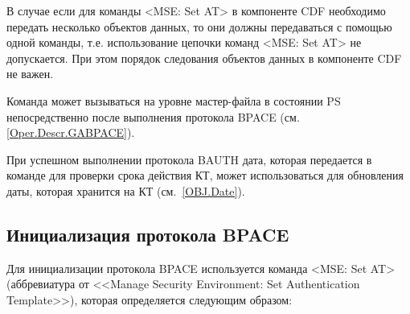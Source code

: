 В случае если для команды <MSE: Set AT> в компоненте CDF необходимо 
передать несколько объектов данных, то они должны передаваться с помощью 
одной команды, т.е. использование цепочки команд <MSE: Set AT> не 
допускается. При этом порядок следования объектов данных в компоненте CDF 
не важен. 

Команда может вызываться на уровне мастер-файла в состоянии PS 
непосредственно после выполнения протокола BPACE (см. \ref{Oper.Descr.GABPACE}).


При успешном выполнении протокола BAUTH дата, которая передается в команде 
для проверки срока действия КТ, может использоваться для обновления даты, 
которая хранится на КТ (см.~\ref{OBJ.Date}). 


\subsection{Инициализация протокола BPACE}
\label{Oper.Descr.SetBPACE}

Для инициализации протокола BPACE используется команда
<MSE: Set AT> (аббревиатура от <<Manage Security Environment: Set 
Authentication Template>>), 
которая определяется следующим образом:

